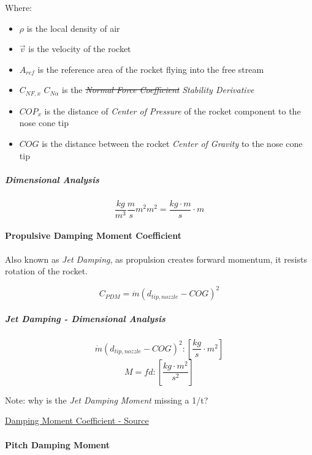 \documentclass[]{article}
\providecommand{\tightlist}{%
  \setlength{\itemsep}{0pt}\setlength{\parskip}{0pt}}
\let\oldparagraph\paragraph
\renewcommand{\paragraph}[1]{\oldparagraph{#1}\mbox{}}
\let\oldsubparagraph\subparagraph
\renewcommand{\subparagraph}[1]{\oldsubparagraph{#1}\mbox{}}
\begin{document}
Where:

\begin{itemize}
\tightlist
\item
  \(\rho\) is the local density of air
\item
  \(\vec{v}\) is the velocity of the rocket
\item
  \(A_{ref}\) is the reference area of the rocket flying into the free
  stream
\item
  \sout{\(C_{NF,x}\)} \(C_{N \alpha}\) is the \sout{\emph{Normal Force
  Coefficient}} \emph{Stability Derivative}
\item
  \(COP_{x}\) is the distance of \emph{Center of Pressure} of the rocket
  component to the nose cone tip
\item
  \(COG\) is the distance between the rocket \emph{Center of Gravity} to
  the nose cone tip
\end{itemize}

\subparagraph{Dimensional Analysis}\label{dimensional-analysis-1}

\begin{equation}
\label{eq_c2a_dim_anal}
\dfrac{kg}{m^3} \dfrac{m}{s} m^2 m^2 = \dfrac{kg \cdot m }{s} \cdot m 
\end{equation}

\paragraph{Propulsive Damping Moment
Coefficient}\label{propulsive-damping-moment-coefficient}

Also known as \emph{Jet Damping}, as propulsion creates forward
momentum, it resists rotation of the rocket.

\begin{equation}
\label{eq_coef_moment_damping_jet}
C_{PDM} = \dot{m} \left( d_{tip,nozzle} - COG \right) ^2
\end{equation}

\subparagraph{Jet Damping - Dimensional
Analysis}\label{jet-damping---dimensional-analysis}

\[
\dot{m} \left( d_{tip,nozzle} - COG \right) ^2 :
\left[ \dfrac{kg}{s} \cdot m^2 \right]
\] \[
M = fd : 
\left[ \dfrac{kg \cdot m^2}{s^2} \right]
\]

Note: why is the \emph{Jet Damping Moment} missing a 1/t?

\href{https://www.apogeerockets.com/education/downloads/Newsletter195.pdf}{Damping
Moment Coefficient - Source}

\paragraph{Pitch Damping Moment}\label{pitch-damping-moment}
\end{document}
